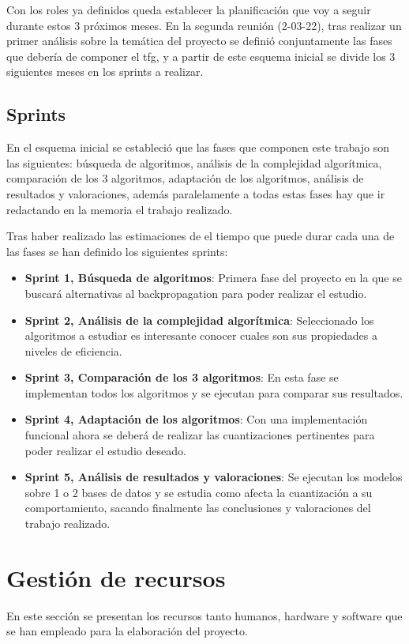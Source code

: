 Con los roles ya definidos queda establecer la planificación que voy a seguir durante estos 3 próximos meses. En la segunda reunión (2-03-22), tras realizar un primer análisis sobre la temática del proyecto se definió conjuntamente las fases que debería de componer el tfg, y a partir de este esquema inicial se divide los 3 siguientes meses en los sprints a realizar.

\subsection{Sprints}

En el esquema inicial se estableció que las fases que componen este trabajo son las siguientes: búsqueda de algoritmos, análisis de la complejidad algorítmica, comparación de los 3 algoritmos, adaptación de los algoritmos, análisis de resultados y valoraciones, además paralelamente a todas estas fases hay que ir redactando en la memoria el trabajo realizado.

Tras haber realizado las estimaciones de el tiempo que puede durar cada una de las fases se han definido los siguientes sprints:

\begin{itemize}
    \item \textbf{Sprint 1, Búsqueda de algoritmos}: Primera fase del proyecto en la que se buscará alternativas al backpropagation para poder realizar el estudio.
    \item \textbf{Sprint 2, Análisis de la complejidad algorítmica}: Seleccionado los algoritmos a estudiar es interesante conocer cuales son sus propiedades a niveles de eficiencia.
    \item \textbf{Sprint 3, Comparación de los 3 algoritmos}: En esta fase se implementan todos los algoritmos y se ejecutan para comparar sus resultados.
    \item \textbf{Sprint 4, Adaptación de los algoritmos}: Con una implementación funcional ahora se deberá de realizar las cuantizaciones pertinentes para poder realizar el estudio deseado.
    \item \textbf{Sprint 5, Análisis de resultados y valoraciones}: Se ejecutan los modelos sobre 1 o 2 bases de datos y se estudia como afecta la cuantización a su comportamiento, sacando finalmente las conclusiones y valoraciones del trabajo realizado.
\end{itemize}

\section{Gestión de recursos}
En este sección se presentan los recursos tanto humanos, hardware y software que se han empleado para la elaboración del proyecto. 
